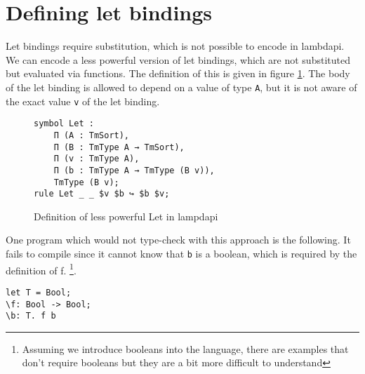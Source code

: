 \section{\label{ch:comp-lambdapi:let}Defining let bindings}

Let bindings require substitution, which is not possible to encode in lambdapi. We can encode a less powerful version of let bindings, which are not substituted but evaluated via functions. The definition of this is given in figure \ref{fig:lp-let}. The body of the let binding is allowed to depend on a value of type \verb|A|, but it is not aware of the exact value \verb|v| of the let binding. 

\begin{figure}[ht]
	\begin{lstlisting}
symbol Let : 
	Π (A : TmSort), 
	Π (B : TmType A → TmSort), 
	Π (v : TmType A),
	Π (b : TmType A → TmType (B v)),
	TmType (B v);
rule Let _ _ $v $b ↪ $b $v;
	\end{lstlisting}
	\caption{Definition of less powerful Let in lampdapi}
	\label{fig:lp-let}
\end{figure}

One program which would not type-check with this approach is the following. It fails to compile since it cannot know that \verb|b| is a boolean, which is required by the definition of f. \footnote{Assuming we introduce booleans into the language, there are examples that don't require booleans but they are a bit more difficult to understand}.
\begin{lstlisting}
let T = Bool;
\f: Bool -> Bool;
\b: T. f b
\end{lstlisting}
